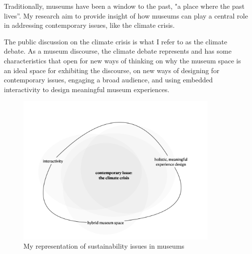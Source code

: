 Traditionally, museums have been a window to the past, "a place where the past lives”. My research aim to provide insight of how museums can play a central role in addressing contemporary issues, like the climate crisis.

The public discussion on the climate crisis is what I refer to as the climate debate. As a museum discourse, the climate debate represents and has some characteristics that open for new ways of thinking on why the museum space is an ideal space for exhibiting the discourse, on new ways of designing for contemporary issues, engaging a broad audience, and using embedded interactivity to design meaningful museum experiences.

\begin{figure}[h]
\includegraphics[width=10cm]{pictures/problem_sphere.png}
\caption{My representation of sustainability issues in museums}
\centering
\end{figure}


